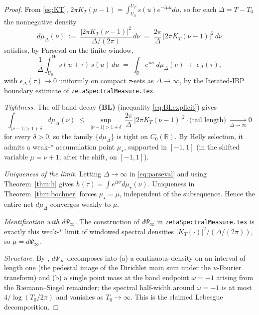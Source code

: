 \documentclass[11pt]{article}
\theoremstyle{definition}
\begin{document}
\begin{proof}
From \eqref{eq:KT}, $2\pi K_{T}(\mu-1)=\int_{U_{0}}^{U_{T}}s(u)e^{-i\mu u}du$,
so for each $\Delta=T-T_{0}$ the nonnegative density
\[
d\mu_{\Delta}(\nu) \;:=\; \frac{|2\pi K_{T}(\nu-1)|^{2}}{\Delta/(2\pi)}\,d\nu
\;=\; \frac{2\pi}{\Delta}\,|2\pi K_{T}(\nu-1)|^{2}\,d\nu
\]
satisfies, by Parseval on the finite window,
\begin{equation}\label{eq:parseval}
\frac{1}{\Delta}\int_{U_{0}}^{W}\!s(u+\tau)\,\overline{s(u)}\,du
\;=\; \int_{\mathbb{R}}e^{i\nu\tau}\,d\mu_{\Delta}(\nu)\;+\;\epsilon_{\Delta}(\tau),
\end{equation}
with $\epsilon_{\Delta}(\tau)\to 0$ uniformly on compact $\tau$-sets as
$\Delta\to\infty$, by the Iterated-IBP boundary estimate of
\texttt{zetaSpectralMeasure.tex}.

\emph{Tightness.} The off-band decay \textbf{(BL)} (inequality
\eqref{eq:BLexplicit}) gives
\[
\int_{|\nu-1|>1+\delta}d\mu_{\Delta}(\nu)
\;\le\;\sup_{|\nu-1|>1+\delta}\,\frac{2\pi}{\Delta}\,|2\pi K_{T}(\nu-1)|^{2}\cdot
\text{(tail length)}\;\xrightarrow[\Delta\to\infty]{}0
\]
for every $\delta>0$, so the family $\{d\mu_{\Delta}\}$ is tight on
$C_{0}(\mathbb{R})$. By Helly selection, it admits a weak-$\ast$
accumulation point $\mu_{\star}$, supported in $[-1,1]$ (in the shifted
variable $\mu=\nu+1$; after the shift, on $[-1,1]$).

\emph{Uniqueness of the limit.} Letting $\Delta\to\infty$ in
\eqref{eq:parseval} and using Theorem~\ref{thm:h} gives
$h(\tau)=\int e^{i\nu\tau}d\mu_{\star}(\nu)$. Uniqueness in
Theorem~\ref{thm:bochner} forces $\mu_{\star}=\mu$, independent of the
subsequence. Hence the entire net $d\mu_{\Delta}$ converges weakly to $\mu$.

\emph{Identification with $d\Psi_{\infty}$.} The construction of
$d\Psi_{\infty}$ in \texttt{zetaSpectralMeasure.tex} is exactly this
weak-$\ast$ limit of windowed spectral densities
$|K_{T}(\cdot)|^{2}/(\Delta/(2\pi))$, so $\mu=d\Psi_{\infty}$.

\emph{Structure.} By \cite[Proposition~3, §5]{exposition}, $d\Psi_{\infty}$
decomposes into (a) a continuous density on an interval of length one
(the pedestal image of the Dirichlet main sum under the $u$-Fourier
transform) and (b) a single point mass at the band endpoint $\omega=-1$
arising from the Riemann--Siegel remainder; the spectral half-width
around $\omega=-1$ is at most $4/\log(T_{0}/2\pi)$ and vanishes as
$T_{0}\to\infty$. This is the claimed Lebesgue decomposition.
\end{proof}
\end{document}
